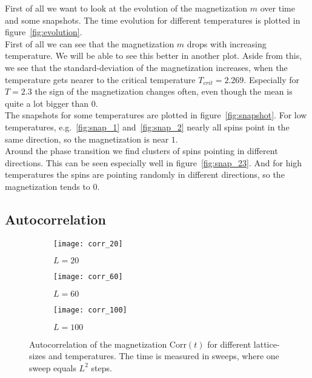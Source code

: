 First of all we want to look at the evolution of the magnetization $m$ over time and some snapshots. The time evolution for different temperatures is plotted in figure~\ref{fig:evolution}.\\
First of all we can see that the magnetization $m$ drops with increasing temperature. We will be able to see this better in another plot. Aside from this, we see that the standard-deviation of the magnetization increases, when the temperature gets nearer to the critical temperature $T_{crit} = 2.269$. Especially for $T = 2.3$ the sign of the magnetization changes often, even though the mean is quite a lot bigger than $0$.\\
The snapshots for some temperatures are plotted in figure~\ref{fig:snapshot}. For low temperatures, e.g.~\ref{fig:snap_1} and~\ref{fig:snap_2} nearly all spins point in the same direction, so the magnetization is near $1$.\\
Around the phase transition we find clusters of spins pointing in different directions. This can be seen especially well in figure~\ref{fig:snap_23}. And for high temperatures the spins are pointing randomly in different directions, so the magnetization tends to $0$.


\subsection{Autocorrelation}

\begin{figure}
  \begin{subfigure}{0.33\textwidth}
    \centering
    \texttt{[image: corr\_20]}
    \caption{$L = 20$}\label{fig:corr_20}
  \end{subfigure}%
  \begin{subfigure}{0.33\textwidth}
    \centering
    \texttt{[image: corr\_60]}
    \caption{$L = 60$}\label{fig:corr_60}
  \end{subfigure}%
  \begin{subfigure}{0.33\textwidth}
    \centering
    \texttt{[image: corr\_100]}
    \caption{$L = 100$}\label{fig:corr_100}
  \end{subfigure}%
  \caption{Autocorrelation of the magnetization Corr$(t)$ for different lattice-sizes and temperatures. The time is measured in sweeps, where one sweep equals $L^2$ steps.}\label{fig:corr}
\end{figure}


